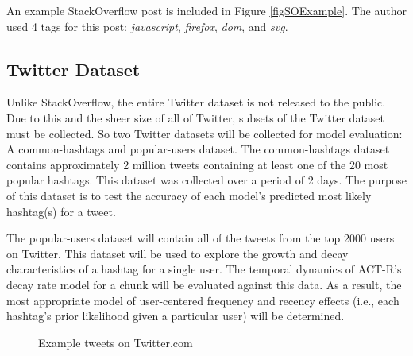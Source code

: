 \documentclass[man,floatsintext]{apa6}
\begin{document}
An example StackOverflow post is included in Figure \ref{figSOExample}.
The author used 4 tags for this post: \emph{javascript}, \emph{firefox}, \emph{dom}, and \emph{svg}.

\subsection{Twitter Dataset}

Unlike StackOverflow, the entire Twitter dataset is not released to the public.
Due to this and the sheer size of all of Twitter, subsets of the Twitter dataset must be collected.
So two Twitter datasets will be collected for model evaluation:
A common-hashtags and popular-users dataset.
The common-hashtags dataset contains approximately 2 million tweets containing at least one of the 20 most popular hashtags.
This dataset was collected over a period of 2 days.
The purpose of this dataset is to test the accuracy of each model's predicted most likely hashtag(s) for a tweet.

The popular-users dataset will contain all of the tweets from the top \num{2000} users on Twitter.
This dataset will be used to explore the growth and decay characteristics of a hashtag for a single user.
The temporal dynamics of ACT-R's decay rate model for a chunk will be evaluated against this data.
As a result, the most appropriate model of user-centered frequency and recency effects (i.e., each hashtag's prior likelihood given a particular user) will be determined.

\begin{figure}[ht]
  \hfill
  \hfill
  \hfill
  \caption{Example tweets on Twitter.com}
  \label{figTweetExample}
\end{figure}
\end{document}
